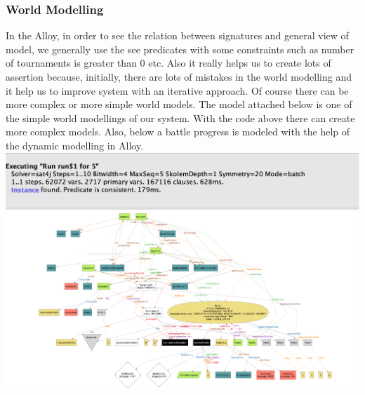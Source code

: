    \subsubsection{World Modelling}
   In the Alloy, in order to see the relation between signatures and general view of model, we generally use the see predicates with some constraints such as number of tournaments is greater than 0 etc. Also it really helps us to create lots of assertion because, initially, there are lots of mistakes in the world modelling and it help us to improve system with an iterative approach. Of course there can be more complex or more simple world models. The model attached below is one of the simple world modellings of our system. With the code above there can create more complex models. Also, below a battle progress is modeled with the help of the dynamic modelling in Alloy.
    \newpage
   \includegraphics[scale=0.3]{Images/Alloy/alloyRun.jpeg}
   \\
  \includegraphics[scale=0.8]{Images/Alloy/World1_Alloy.png}

